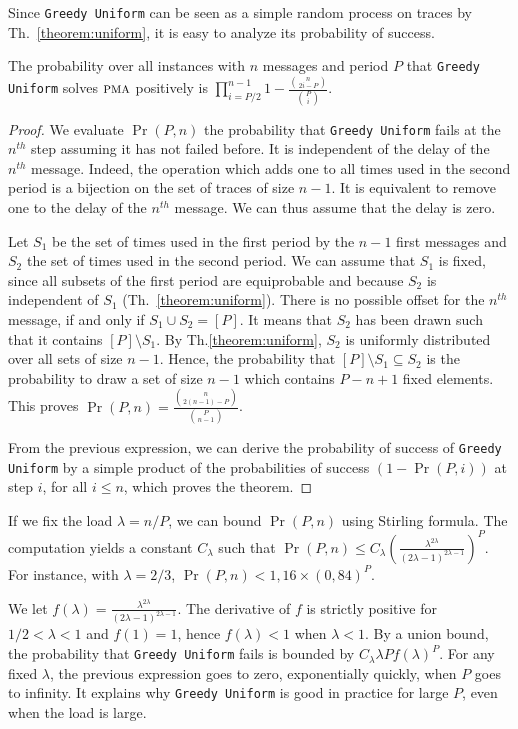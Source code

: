 \documentclass[a4paper,UKenglish,cleveref, autoref, thm-restate]{lipics-v2019}
\newcommand\pma{\textsc{pma}\xspace}
\newcommand\greedyuniform{\texttt{Greedy Uniform}\xspace}
\begin{document}
Since \greedyuniform can be seen as a simple random process on traces by Th.~\ref{theorem:uniform}, it is easy to analyze its probability of success.

\begin{theorem}\label{theorem:uniform}
The probability over all instances with $n$ messages and period $P$ that \greedyuniform solves $\pma$ positively is $\displaystyle{\prod_{i=P/2}^{n-1}1 - \frac{\binom{n}{2i-P}}{\binom{P}{i}}}$.
\end{theorem}
\begin{proof}
We evaluate $\Pr(P,n)$ the probability that \greedyuniform fails at the $n^{th}$ step assuming it has not failed before. It is independent of the delay of the $n^{th}$ message. Indeed, the operation which adds one to all times used in the second period is a bijection on the set of traces of size $n-1$. It is equivalent to remove one to the delay of the $n^{th}$ message. We can thus assume that the delay is zero.

Let $S_1$ be the set of times used in the first period by the $n-1$ first messages
and $S_2$ the set of times used in the second period. We can assume that $S_1$ is fixed, since all subsets of the first period are equiprobable and because $S_2$ is independent of $S_1$ (Th.~\ref{theorem:uniform}). There is no possible offset for the $n^{th}$ message, if and only if $S_1 \cup S_2 = [P]$. It means that $S_2$ has been drawn such that it contains $[P] \setminus S_1$. By Th.\ref{theorem:uniform}, $S_2$ is uniformly distributed over all sets of size $n-1$. Hence, the probability that  $[P]  \setminus S_1 \subseteq S_2$  is the probability to draw a set of size $n-1$ which contains $P-n + 1$ fixed elements. This proves $\Pr(P,n) = \frac{\binom{n}{2(n-1)-P}}{\binom{P}{n-1}}$.

From the previous expression, we can derive the probability of success of \greedyuniform by a simple product of 
the probabilities of success $(1 - \Pr(P,i))$ at step $i$, for all $i \leq n$, which proves the theorem. 
\end{proof}


If we fix the load $\lambda = n/P$, we can bound $\Pr(P,n)$ using Stirling formula. The computation yields a constant $C_{\lambda}$
such that $\Pr(P,n) \leq C_{\lambda} \left(\frac{\lambda^{2\lambda}}{(2\lambda -1)^{2\lambda -1}}\right)^P$.
For instance, with $\lambda = 2/3$, $\Pr(P,n) < 1,16 \times (0,84)^P$.

We let $f(\lambda) = \frac{\lambda^{2\lambda}}{(2\lambda -1)^{2\lambda -1}}$.
The derivative of $f$ is strictly positive for $1/2 < \lambda < 1$ and $f(1) = 1$, hence 
$f(\lambda) < 1$ when $\lambda < 1$. By a union bound, the probability that \greedyuniform fails is bounded by $C_{\lambda} \lambda P f(\lambda)^P$. For any fixed $\lambda$, the previous expression goes to zero, exponentially quickly, when $P$ goes to infinity. It explains why \greedyuniform is good in practice for large $P$, even when the load is large. 
\end{document}
